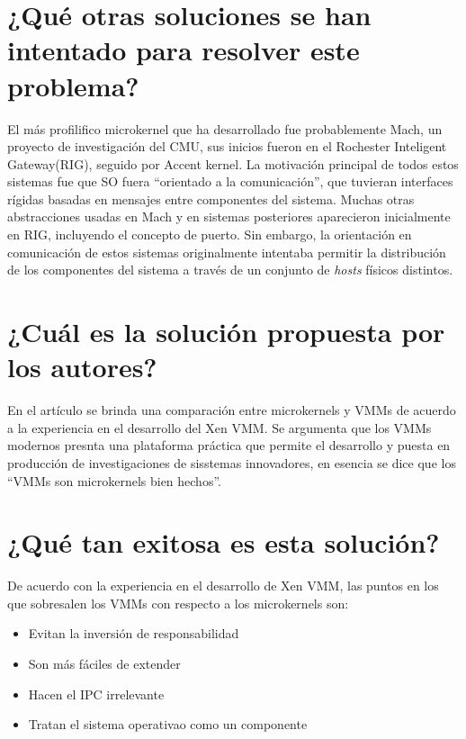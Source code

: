 \section{¿Qué otras soluciones se han intentado para resolver este problema?}
El más profilifico microkernel que ha desarrollado fue probablemente Mach, un proyecto de investigación del CMU, sus inicios fueron en el Rochester Inteligent Gateway(RIG), seguido por Accent kernel. La motivación principal de todos estos sistemas fue que SO fuera ``orientado a la comunicación'', que tuvieran interfaces rígidas basadas en mensajes entre componentes del sistema. Muchas otras abstracciones usadas en Mach y en sistemas posteriores aparecieron inicialmente en RIG, incluyendo el concepto de puerto. Sin embargo, la orientación en comunicación de estos sistemas originalmente intentaba permitir la distribución de los componentes del sistema a través de un conjunto de \emph{hosts} físicos distintos.
     
\section{¿Cuál es la solución propuesta por los autores?}
En el artículo se brinda una comparación entre microkernels y VMMs de acuerdo a la experiencia en el desarrollo del Xen VMM. Se argumenta que los VMMs modernos presnta una plataforma práctica que permite el desarrollo y puesta en producción de investigaciones de sisstemas innovadores, en esencia se dice que los ``VMMs son microkernels bien hechos''. 

\section{¿Qué tan exitosa es esta solución?} 
De acuerdo con la experiencia en el desarrollo de Xen VMM, las puntos en los que sobresalen los VMMs con respecto a los microkernels son:
\begin{itemize}
    \item Evitan la inversión de responsabilidad
    \item Son más fáciles de extender
    \item Hacen el IPC irrelevante
    \item Tratan el sistema operativao como un componente
\end{itemize}





















